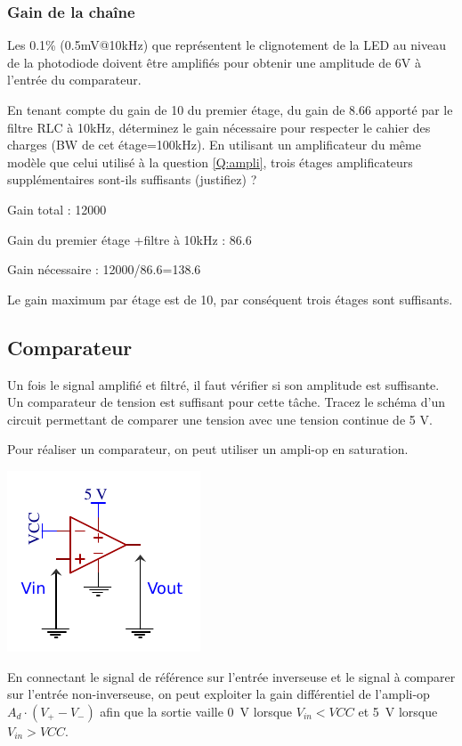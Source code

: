 \documentclass{../template/tp}
\begin{document}
 \subsubsection{Gain de la chaîne}

 Les 0.1\% (0.5mV@10kHz) que représentent le clignotement de la LED au niveau de la photodiode doivent être amplifiés pour obtenir une amplitude de 6V à l'entrée du comparateur.

 \Question
 {
 En tenant compte du gain de 10 du premier étage, du gain de 8.66 apporté par le filtre RLC à 10kHz, déterminez le gain nécessaire pour respecter le cahier des charges (BW de cet étage=100kHz). En utilisant un amplificateur du même modèle que celui utilisé à la question \ref{Q:ampli}, trois étages amplificateurs supplémentaires sont-ils suffisants (justifiez) ?

 }
 {%
 Gain total : 12000

 Gain du premier étage +filtre à 10kHz : 86.6

 Gain nécessaire : 12000/86.6=138.6

 Le gain maximum par étage est de 10, par conséquent trois étages sont suffisants.
 }

\subsection{Comparateur}
Un fois le signal amplifié et filtré, il faut vérifier si son amplitude est suffisante. Un comparateur de tension est suffisant pour cette tâche.
\Question
{
Tracez le schéma d'un circuit permettant de comparer une tension avec une tension continue de 5 V.
}
{%
Pour réaliser un comparateur, on peut utiliser un ampli-op en saturation.

\begin{center}
	\includegraphics[scale=1.4]{comparateur.pdf}
\end{center}

En connectant le signal de référence sur l'entrée inverseuse et le signal à comparer sur l'entrée non-inverseuse, on peut exploiter la gain différentiel de l'ampli-op $A_d \cdot (V_+ - V_-)$ afin que la sortie vaille 0~V lorsque $V_{in} < VCC$ et 5~V lorsque $V_{in} > VCC$.
}
%
\end{document}
